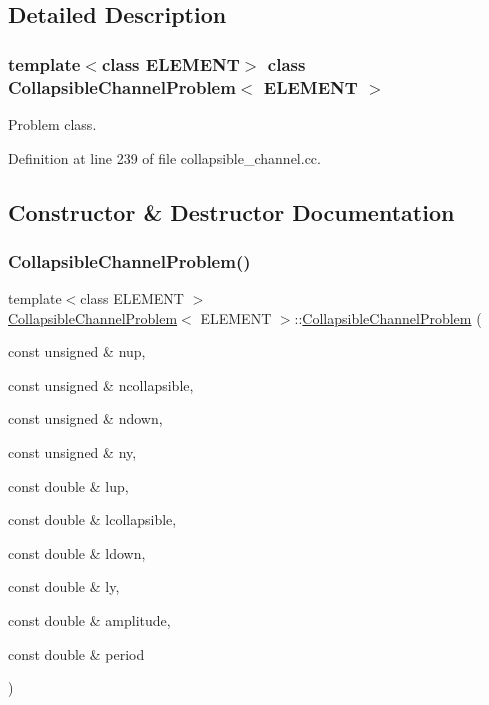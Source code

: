 \subsection{Detailed Description}
\subsubsection*{template$<$class E\+L\+E\+M\+E\+NT$>$\newline
class Collapsible\+Channel\+Problem$<$ E\+L\+E\+M\+E\+N\+T $>$}

Problem class. 

Definition at line 239 of file collapsible\+\_\+channel.\+cc.



\subsection{Constructor \& Destructor Documentation}
\mbox{\label{classCollapsibleChannelProblem_ab43fa30667f57e8019c8b30fd93156f8}} 
\subsubsection{\texorpdfstring{Collapsible\+Channel\+Problem()}{CollapsibleChannelProblem()}\hspace{0.1cm}{\footnotesize\ttfamily [1/2]}}
{\footnotesize\ttfamily template$<$class E\+L\+E\+M\+E\+NT $>$ \\
\hyperlink{classCollapsibleChannelProblem}{Collapsible\+Channel\+Problem}$<$ E\+L\+E\+M\+E\+NT $>$\+::\hyperlink{classCollapsibleChannelProblem}{Collapsible\+Channel\+Problem} (\begin{DoxyParamCaption}\item[{const unsigned \&}]{nup,  }\item[{const unsigned \&}]{ncollapsible,  }\item[{const unsigned \&}]{ndown,  }\item[{const unsigned \&}]{ny,  }\item[{const double \&}]{lup,  }\item[{const double \&}]{lcollapsible,  }\item[{const double \&}]{ldown,  }\item[{const double \&}]{ly,  }\item[{const double \&}]{amplitude,  }\item[{const double \&}]{period }\end{DoxyParamCaption})}



